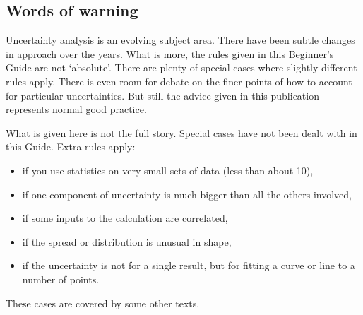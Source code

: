 \subsection{Words of warning}
Uncertainty analysis is an evolving subject area. There have been subtle changes in approach over the years. What is more, the rules given in this Beginner's Guide are not `absolute'. There are plenty of special cases where slightly different rules apply. There is even room for debate on the finer points of how to account for particular uncertainties. But still the advice given in this publication represents normal good practice.

What is given here is not the full story. Special cases have not been dealt with in this Guide. Extra rules apply:
\begin{itemize}
\item if you use statistics on very small sets of data (less than about 10),
\item if one component of uncertainty is much bigger than all the others involved,
\item if some inputs to the calculation are correlated,
\item if the spread or distribution is unusual in shape,
\item if the uncertainty is not for a single result, but for fitting a curve or line to a number of points.
\end{itemize}
These cases are covered by some other texts.

